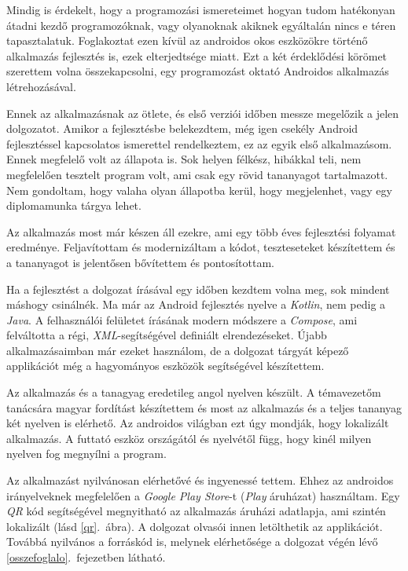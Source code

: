 \documentclass[12pt,a4paper]{article}
\newcommand{\xml}{\textit{XML}\xspace}
\begin{document}
	Mindig is érdekelt, hogy a programozási ismereteimet hogyan tudom hatékonyan átadni kezdő programozóknak, vagy olyanoknak akiknek egyáltalán nincs e téren tapasztalatuk. Foglakoztat ezen kívül az androidos okos eszközökre történő alkalmazás fejlesztés is, ezek elterjedtsége miatt. Ezt a két érdeklődési körömet szerettem volna összekapcsolni, egy programozást oktató Androidos alkalmazás létrehozásával.
	
	Ennek az alkalmazásnak az ötlete, és első verziói időben messze megelőzik a jelen dolgozatot. Amikor a fejlesztésbe belekezdtem, még igen csekély Android fejlesztéssel kapcsolatos ismerettel rendelkeztem, ez az egyik első alkalmazásom. Ennek megfelelő volt az állapota is. Sok helyen félkész, hibákkal teli, nem megfelelően tesztelt program volt, ami csak egy rövid tananyagot tartalmazott. Nem gondoltam, hogy valaha olyan állapotba kerül, hogy megjelenhet, vagy egy diplomamunka tárgya lehet.
	
	Az alkalmazás most már készen áll ezekre, ami egy több éves fejlesztési folyamat eredménye. Feljavítottam és modernizáltam a kódot, teszteseteket készítettem és a tananyagot is jelentősen bővítettem és pontosítottam.
	
	Ha a fejlesztést a dolgozat írásával egy időben kezdtem volna meg, sok mindent máshogy csinálnék. Ma már az Android fejlesztés nyelve a \textit{Kotlin}, nem pedig a \textit{Java}. A felhasználói felületet írásának modern módszere a \textit{Compose}, ami felváltotta a régi, \xml-segítségével definiált elrendezéseket. 
	Újabb alkalmazásaimban már ezeket használom, de a dolgozat tárgyát képező applikációt még a hagyományos eszközök segítségével készítettem.
	
	Az alkalmazás és a tanagyag eredetileg angol nyelven készült. A témavezetőm tanácsára magyar fordítást készítettem és most az alkalmazás és a teljes tananyag két nyelven is elérhető. Az androidos világban ezt úgy mondják, hogy lokalizált alkalmazás. A futtató eszköz országától és nyelvétől függ, hogy kinél milyen 
	nyelven fog megnyílni a program.
	
	Az alkalmazást nyilvánosan elérhetővé és ingyenessé tettem. Ehhez az androidos irányelveknek megfelelően a \textit{Google Play Store}-t (\textit{Play} áruházat) használtam. Egy \textit{QR} kód segítségével megnyitható az alkalmazás áruházi adatlapja, ami szintén lokalizált (lásd \ref{qr}.\ ábra). A dolgozat olvasói innen letölthetik az applikációt. Továbbá nyilvános a forráskód is, melynek elérhetősége a dolgozat végén lévő \ref{osszefoglalo}.\ fejezetben látható.
	
\end{document}
